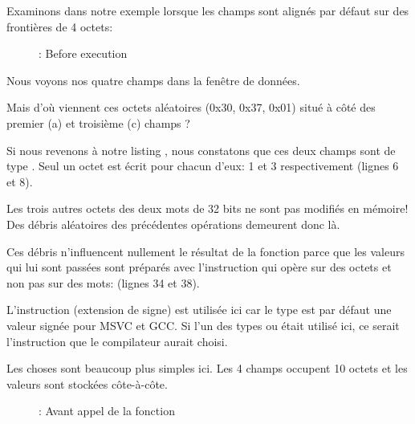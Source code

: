 ﻿\clearpage
{}
\myindex{\olly}

Examinons dans \olly notre exemple lorsque les champs sont alignés par défaut sur des frontières de 4 octets:

\begin{figure}[H]
\centering
{}
\caption{\olly: Before \printf execution}
\label{fig:packing_olly_4}
\end{figure}

Nous voyons nos quatre champs dans la fenêtre de données.

Mais d'où viennent ces octets aléatoires (0x30, 0x37, 0x01) situé à côté des premier (a) et troisième (c)
champs ?

Si nous revenons à notre listing , nous constatons que ces deux champs sont de
type \Tchar. Seul un octet est écrit pour chacun d'eux: 1 et 3 respectivement (lignes 6 et 8).

Les trois autres octets des deux mots de 32 bits ne sont pas modifiés en mémoire! Des débris aléatoires des 
précédentes opérations demeurent donc là.


Ces débris n'influencent nullement le résultat de la fonction \printf parce que les valeurs qui lui sont 
passées sont préparés avec l'instruction \MOVSX qui opère sur des octets et non pas sur des mots: 
 (lignes 34 et 38).

L'instruction \MOVSX (extension de signe) est utilisée ici car le type \Tchar est par défaut une valeur 
signée pour MSVC et GCC. Si l'un des types  ou  était utilisé ici, ce serait 
l'instruction \MOVZX que le compilateur aurait choisi.

\clearpage
{}
\myindex{\olly}

Les choses sont beaucoup plus simples ici. Les 4 champs occupent 10 octets et les valeurs sont stockées 
côte-à-côte.

\begin{figure}[H]
\centering
{}
\caption{\olly: Avant appel de la fonction \printf}
\label{fig:packing_olly_1}
\end{figure}
